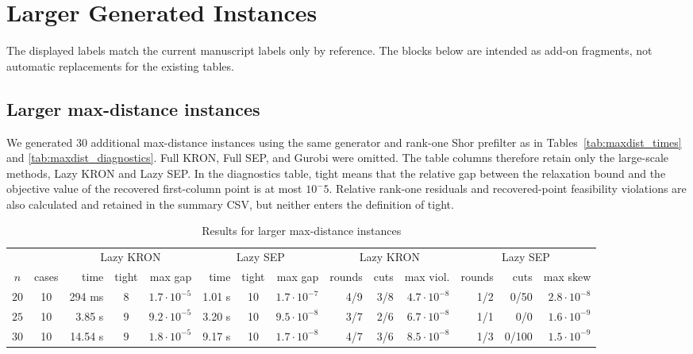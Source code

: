 \documentclass[11pt]{article}
\begin{document}
\section{Larger Generated Instances}
The displayed labels match the current manuscript labels only by reference.
The blocks below are intended as add-on fragments, not automatic replacements
for the existing tables.

\subsection*{Larger max-distance instances}

\noindent We generated 30 additional max-distance instances using the same generator
and rank-one Shor prefilter as in Tables~\ref{tab:maxdist_times} and
\ref{tab:maxdist_diagnostics}.  Full KRON, Full SEP, and Gurobi were omitted.
The table columns therefore retain only the large-scale methods, Lazy KRON and
Lazy SEP.  In the diagnostics table, tight means that the relative gap between
the relaxation bound and the objective value of the recovered first-column
point is at most \(10^-5\).  Relative rank-one residuals and recovered-point
feasibility violations are also calculated and retained in the summary CSV,
but neither enters the definition of tight.


\begin{table}[htbp]
\centering
\caption{Results for larger max-distance instances}
\label{tab:maxdist_larger}
\vskip 10pt
\begingroup
\setlength{\tabcolsep}{2.5pt}
\small
\begin{tabular}{c c|r c r|r c r|r r r|r r r}
\hline
& &\multicolumn{3}{c|}{Lazy KRON} & \multicolumn{3}{c|}{Lazy SEP} & \multicolumn{3}{c|}{Lazy KRON} & \multicolumn{3}{c}{Lazy SEP} \\
$n$& cases& time &tight & max gap & time &tight & max gap & rounds & cuts & max viol. & rounds & cuts & max skew \\
\hline
$20$ &10&294 ms & 8 & $1.7\cdot 10^{-5}$ & 1.01 s &10 & $1.7\cdot 10^{-7}$ & 4/9 & 3/8 & $4.7\cdot 10^{-8}$ & 1/2 & 0/50 & $2.8\cdot 10^{-8}$ \\
$25$ &10&3.85 s & 9 & $9.2\cdot 10^{-5}$ & 3.20 s &10 & $9.5\cdot 10^{-8}$ & 3/7 & 2/6 & $6.7\cdot 10^{-8}$ & 1/1 & 0/0 & $1.6\cdot 10^{-9}$ \\
$30$ &10&14.54 s & 9 & $1.8\cdot 10^{-5}$ & 9.17 s &10 & $1.7\cdot 10^{-8}$ & 4/7 & 3/6 & $8.5\cdot 10^{-8}$ & 1/3 & 0/100 & $1.5\cdot 10^{-9}$ \\
\hline
\hline
\end{tabular}
\endgroup
\end{table}
\end{document}
